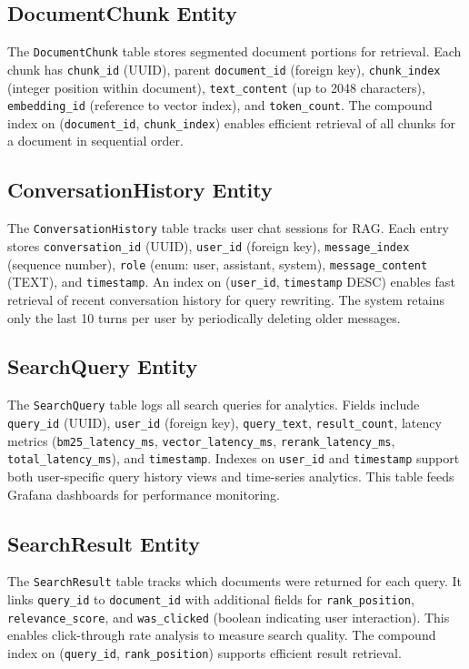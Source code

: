 \subsection{DocumentChunk Entity}
The \texttt{DocumentChunk} table stores segmented document portions for retrieval. Each chunk has \texttt{chunk\_id} (UUID), parent \texttt{document\_id} (foreign key), \texttt{chunk\_index} (integer position within document), \texttt{text\_content} (up to 2048 characters), \texttt{embedding\_id} (reference to vector index), and \texttt{token\_count}. The compound index on (\texttt{document\_id}, \texttt{chunk\_index}) enables efficient retrieval of all chunks for a document in sequential order.

\subsection{ConversationHistory Entity}
The \texttt{ConversationHistory} table tracks user chat sessions for RAG. Each entry stores \texttt{conversation\_id} (UUID), \texttt{user\_id} (foreign key), \texttt{message\_index} (sequence number), \texttt{role} (enum: user, assistant, system), \texttt{message\_content} (TEXT), and \texttt{timestamp}. An index on (\texttt{user\_id}, \texttt{timestamp} DESC) enables fast retrieval of recent conversation history for query rewriting. The system retains only the last 10 turns per user by periodically deleting older messages.

\subsection{SearchQuery Entity}
The \texttt{SearchQuery} table logs all search queries for analytics. Fields include \texttt{query\_id} (UUID), \texttt{user\_id} (foreign key), \texttt{query\_text}, \texttt{result\_count}, latency metrics (\texttt{bm25\_latency\_ms}, \texttt{vector\_latency\_ms}, \texttt{rerank\_latency\_ms}, \texttt{total\_latency\_ms}), and \texttt{timestamp}. Indexes on \texttt{user\_id} and \texttt{timestamp} support both user-specific query history views and time-series analytics. This table feeds Grafana dashboards for performance monitoring.

\subsection{SearchResult Entity}
The \texttt{SearchResult} table tracks which documents were returned for each query. It links \texttt{query\_id} to \texttt{document\_id} with additional fields for \texttt{rank\_position}, \texttt{relevance\_score}, and \texttt{was\_clicked} (boolean indicating user interaction). This enables click-through rate analysis to measure search quality. The compound index on (\texttt{query\_id}, \texttt{rank\_position}) supports efficient result retrieval.


